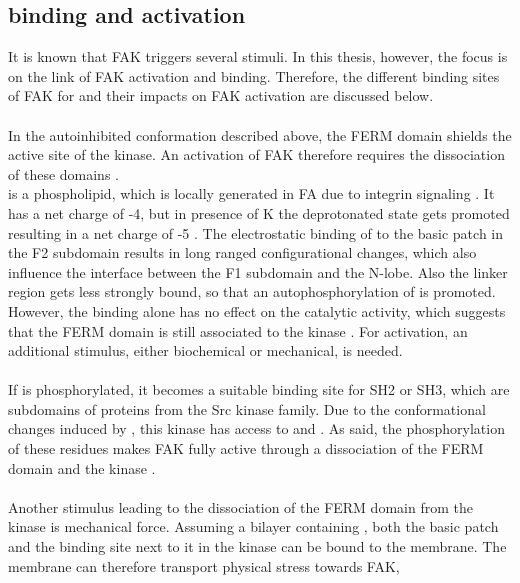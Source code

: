 \subsection{\pip{} binding and activation}
It is known that FAK triggers several stimuli. In this thesis, however, the focus is on the link of FAK activation and \pip{} binding. Therefore, the different binding sites of FAK for \pip{} and their impacts on FAK activation are discussed below.\\
\\In the autoinhibited conformation described above, the FERM domain shields the active site of the kinase. An activation of FAK therefore requires the dissociation of these domains \autocite{structFAK}.\\
\pip{} is a phospholipid, which is locally generated in FA due to integrin signaling \autocite{CITATION34}. 
It has a net charge of -4, but in presence of K the deprotonated state gets promoted resulting in a net charge of -5 \autocite{pip2_minus5}. The electrostatic binding of \pip{} to the basic patch in the F2 subdomain results in long ranged configurational changes, which also influence the interface between the F1 subdomain and the N-lobe. Also the linker region gets less strongly bound, so that an autophosphorylation of  is promoted. However, the \pip{} binding alone has no effect on the catalytic activity, which suggests that the FERM domain is still associated to the kinase \autocites{pap001}{pap003}. For activation, an additional stimulus, either biochemical or mechanical, is needed.\\
\\
If  is phosphorylated, it becomes a suitable binding site for SH2 or SH3, which are subdomains of proteins from the Src kinase family. Due to the conformational changes induced by \pip{}, this kinase has access to 
and . As said, the phosphorylation of these residues makes FAK fully active through a dissociation of the FERM domain and the kinase \autocite{pap001}.\\
\\
Another stimulus leading to the dissociation of the FERM domain from the kinase is mechanical force. Assuming a bilayer containing \pip{}, both the basic patch and the \pip{} binding site next to it in the kinase can be bound to the membrane. The membrane can therefore transport physical stress towards FAK,
